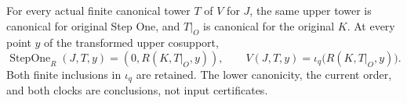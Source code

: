 \begin{theorem}
\label{hir:disjoint-canonical-normal-history}
\leanok
For every actual finite canonical tower $T$ of $V$ for $J$, the same upper
tower is canonical for original Step One, and $T|_O$ is canonical for the
original $K$. At every point $y$ of the transformed upper cosupport,
\[
 \operatorname{StepOne}_R(J,T,y)=(0,R(K,T|_O,y)),\qquad
 V(J,T,y)=\iota_q\bigl(R(K,T|_O,y)\bigr).
\]
Both finite inclusions in $\iota_q$ are retained. The lower canonicity, the
current order, and both clocks are conclusions, not input certificates.
\end{theorem}

